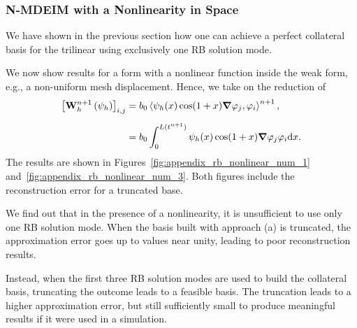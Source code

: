 \documentclass[../../thesis.tex]{subfiles}
\newcommand{\inner}[2]{\left<#1, #2\right>}
\newcommand{\Ah}[1]{\ensuremath{\vb{#1}^{n+1}_h}}
\begin{document}
\subsubsection{N-MDEIM with a Nonlinearity in Space}
We have shown in the previous section how 
one can achieve a perfect collateral basis for the trilinear using exclusively one RB solution mode.

We now show results for a form with a nonlinear function inside the weak form, e.g., 
a non-uniform mesh displacement. 
Hence, we take on the reduction of
\begin{equation}
    \begin{split}
        \qty[\Ah{W}\left(\psi_{h}\right)]_{i,j}
        &= b_0 \inner{\psi_h(x) \cos(1+x) \grad \varphi_j}{\varphi_i}^{n+1},
        \\[2mm]
        &= b_0 \int_{0}^{L(t^{n+1})} \psi_h(x) \cos(1+x) \grad \varphi_j \varphi_i \dd x.
    \end{split}
\end{equation}
The results are shown in Figures~\ref{fig:appendix_rb_nonlinear_num_1} 
and~\ref{fig:appendix_rb_nonlinear_num_3}.
Both figures include the reconstruction error for a truncated base.

We find out that in the presence of a nonlinearity, 
it is unsufficient to use only one RB solution mode. 
When the basis built with approach (a) is truncated, the approximation error goes up 
to values near unity,
leading to poor reconstruction results.

Instead, when the first three RB solution modes are used to build the collateral basis,
truncating the outcome leads to a feasible basis.
The truncation leads to a higher approximation error, but still sufficiently small to produce
meaningful results if it were used in a simulation.    
\end{document}
